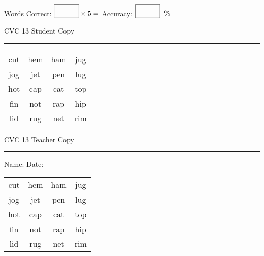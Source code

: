 \documentclass{memoir}
\begin{document}
\normalsize

Words Correct: $\fbox{\phantom{\huge 100}} \times 5 = $ Accuracy: $\fbox{\phantom{\huge 100}}\;\; \%$ 

\vfill

\newpage


\footnotesize \noindent
CVC 13 \hfill Student Copy
\smallskip
\hrule

\huge

\setlength{\tabcolsep}{14pt}
\def\arraystretch{2}

{\selectfont


\begin{vplace}[0.5]
\begin{center}
\begin{tabular}{cccc}
cut & hem & ham & jug \\
jog & jet & pen & lug \\
hot & cap & cat & top \\
fin & not & rap & hip \\
lid & rug & net & rim \\
\end{tabular}
\end{center}
\end{vplace}

}

\newpage

\footnotesize \noindent
CVC 13 \hfill Teacher Copy
\smallskip
\hrule

\normalsize

\vfill

\noindent
Name: \underline{\hspace{1.75in}} \hfill Date: \underline{\hspace{1in}}

\huge

{\selectfont


\begin{vplace}[0.5]
\begin{center}
\begin{tabular}{cccc}
cut & hem & ham & jug \\
jog & jet & pen & lug \\
hot & cap & cat & top \\
fin & not & rap & hip \\
lid & rug & net & rim \\
\end{tabular}
\end{center}
\end{vplace}



}
\end{document}

